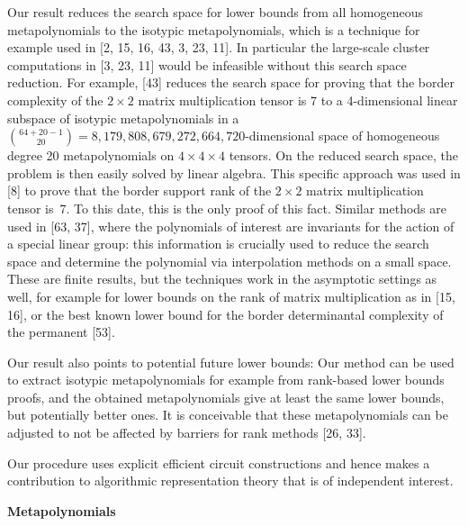 \documentclass[10pt,a4paper]{article}
\begin{document}
Our result reduces the search space for lower bounds from all homogeneous metapolynomials to the isotypic metapolynomials, which is a technique for example used in
[2, 15, 16, 43, 3, 23, 11]. In particular the large-scale cluster computations in [3, 23, 11] would be infeasible without this search space reduction. For example, [43] reduces the search space for proving that the border complexity of the $2\times 2$ matrix multiplication tensor is 7 to a 4-dimensional linear subspace of isotypic metapolynomials in a $\binom{64+20-1}{20}=8,179,808,679,272,664,720$-dimensional space of homogeneous degree 20 metapolynomials on $4\times 4\times 4$ tensors. On the reduced search space, the problem is then easily solved by linear algebra.
This specific approach was used in [8] to prove that the border support rank of the $2\times 2$ matrix multiplication tensor is 7. To this date, this is the only proof of this fact.
Similar methods are used in [63, 37], where the polynomials of interest are invariants for the action of a special linear group: this information is crucially used to reduce the search space and determine the polynomial via interpolation methods on a small space.
These are finite results, but the techniques work in the asymptotic settings as well, for example for lower bounds on the rank of matrix multiplication as in [15, 16], or the
best known lower bound for the border determinantal complexity of the permanent
[53].





Our result also points to potential future lower bounds:
Our method can be used to extract isotypic metapolynomials for example from rank-based lower bounds proofs, and the obtained metapolynomials give at least the same lower bounds, but potentially better ones.
It is conceivable that these metapolynomials can be adjusted to not be affected by barriers for rank methods [26, 33].





Our procedure uses explicit efficient circuit constructions and hence makes a contribution to algorithmic representation theory that is of independent interest.





\par\medskip\noindent\textbf{Metapolynomials}\par
\end{document}
